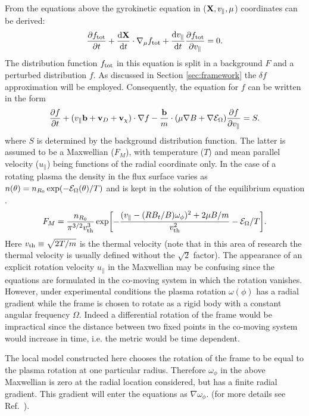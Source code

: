 From the equations above the gyrokinetic equation in (${\bf X}, v_\parallel, 
\mu$) coordinates can be derived: \cite{LIT83,PEE09}
\begin{equation} 
{\partial f_{\rm tot} \over \partial t} + {{\rm d} {\bf X} \over {\rm d} t} \cdot \nabla_\mu 
f_{\rm tot} + {{\rm d} v_\parallel \over {\rm d} t} {\partial f_{\rm tot} \over \partial v_\parallel} = 0 .
\end{equation} 
The distribution function $f_{\rm tot}$ in this equation is split in a background $F$ and a perturbed 
distribution $f$. As discussed in Section \ref{sec:framework} the $\delta f$ approximation 
will be employed. 
Consequently, the equation for $f$ can be written in the form \cite{PEE09}
\begin{equation} 
{\partial f \over \partial t} + (v_\parallel {\bf b} + {\bf v}_D + {\bf v}_\chi) \cdot \nabla f  
-{{\bf b} \over m}\cdot(\mu \nabla B + \nabla \mathcal{E}_\Omega){\partial f \over \partial v_\parallel} = S. 
\end{equation}
where $S$ is determined by the background distribution function.
The latter is assumed to be a Maxwellian ($F_M$), with
temperature ($T$) and mean parallel velocity ($u_\parallel$) being functions of the radial coordinate only.
In the case of a rotating plasma the density in the flux surface varies as $n(\theta)=n_{R_0} \exp(-\mathcal{E}_\Omega(\theta)/T)$
and is kept in the solution of the equilibrium equation \cite{PEE09}.
\begin{equation} 
\label{eq:maxwell}
F_M = {n_{R_0} \over \pi^{3/2} v_{\rm th}^3 } \exp 
\biggl [ - {(v_\parallel-(R B_t/B)\omega_\phi )^2 + 2 \mu B / m \over v_{\rm th}^2} - \mathcal{E}_\Omega/T \biggr ] . 
\end{equation} 
Here $v_{\rm th}\equiv \sqrt{ 2 T / m}$ is the thermal velocity (note that in this area of 
research the thermal velocity is usually defined without the $\sqrt{2}$ factor).
The appearance of an explicit rotation velocity $u_\parallel$ in the Maxwellian may be confusing since the equations are formulated
in the co-moving system in which the rotation vanishes. 
However, under experimental conditions the plasma rotation $\omega(\phi)$ has a radial gradient while the frame is chosen
to rotate as a rigid body with a constant angular frequency $\Omega$. 
Indeed a differential rotation of the frame would be impractical since the distance between two
fixed points in the co-moving 
system would increase in time, i.e. the metric would be time dependent. 

The local model constructed here chooses the rotation of the frame to be equal to the plasma rotation at one particular radius. 
Therefore $\omega_\phi$ in the above Maxwellian is zero at the radial location considered, but has a finite radial gradient. This 
gradient will enter the equations as $\nabla \omega_\phi$. (for more details see Ref.~\cite{PEE09}).  

